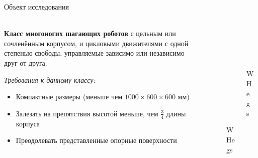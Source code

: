 \documentclass[aspectratio=169,xcolor=table,10pt]{beamer}
\begin{document}
\begin{frame}[t]{Объект исследования}
    \framesubtitle{}
    \begin{columns}[T,onlytextwidth]
        \begin{column}{0.54\textwidth}
            \textbf{Класс многоногих шагающих роботов} с цельным или сочленённым корпусом, и цикловыми движителями с одной степенью свободы, управляемые зависимо или независимо друг от друга.

            \textit{Требования к данному классу}:
            \begin{itemize}
                \item Компактные размеры (меньше чем $1000\times600\times600$ мм)
                \item Залезать на препятствия высотой меньше, чем $\frac{3}{4}$ длины корпуса
                \item Преодолевать представленные
                      опорные поверхности
            \end{itemize}
        \end{column}
        \begin{column}{0.44\textwidth}
            \begin{figure}[H]
                \hfill
                \begin{subfigure}{0.99\textwidth}
                    \centering\includegraphics[height=2cm,width=1\textwidth,keepaspectratio]{from_master/whegs2.jpg}
                    \caption{WHegs}
                    \label{fig:from_master/whegs2.jpg}
                \end{subfigure}


\end{figure}
\end{column}
\end{columns}
\end{frame}
\end{document}
